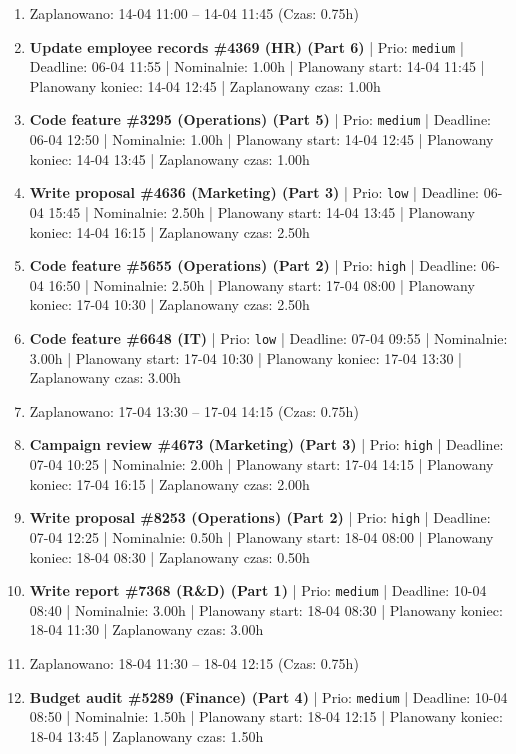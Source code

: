 {\begin{enumerate}
  \item [\textbf{PRZERWA}] Zaplanowano: 14-04 11:00 -- 14-04 11:45 (Czas: 0.75h)
  \item [\textbf{14658}] \textbf{Update employee records \#4369 (HR) (Part 6)} | Prio: \texttt{medium} | Deadline: 06-04 11:55 | Nominalnie: 1.00h | Planowany start: 14-04 11:45 | Planowany koniec: 14-04 12:45 | Zaplanowany czas: 1.00h
  \item [\textbf{14645}] \textbf{Code feature \#3295 (Operations) (Part 5)} | Prio: \texttt{medium} | Deadline: 06-04 12:50 | Nominalnie: 1.00h | Planowany start: 14-04 12:45 | Planowany koniec: 14-04 13:45 | Zaplanowany czas: 1.00h
  \item [\textbf{14684}] \textbf{Write proposal \#4636 (Marketing) (Part 3)} | Prio: \texttt{low} | Deadline: 06-04 15:45 | Nominalnie: 2.50h | Planowany start: 14-04 13:45 | Planowany koniec: 14-04 16:15 | Zaplanowany czas: 2.50h
  \item [\textbf{14626}] \textbf{Code feature \#5655 (Operations) (Part 2)} | Prio: \texttt{high} | Deadline: 06-04 16:50 | Nominalnie: 2.50h | Planowany start: 17-04 08:00 | Planowany koniec: 17-04 10:30 | Zaplanowany czas: 2.50h
  \item [\textbf{14683}] \textbf{Code feature \#6648 (IT)} | Prio: \texttt{low} | Deadline: 07-04 09:55 | Nominalnie: 3.00h | Planowany start: 17-04 10:30 | Planowany koniec: 17-04 13:30 | Zaplanowany czas: 3.00h
  \item [\textbf{PRZERWA}] Zaplanowano: 17-04 13:30 -- 17-04 14:15 (Czas: 0.75h)
  \item [\textbf{14625}] \textbf{Campaign review \#4673 (Marketing) (Part 3)} | Prio: \texttt{high} | Deadline: 07-04 10:25 | Nominalnie: 2.00h | Planowany start: 17-04 14:15 | Planowany koniec: 17-04 16:15 | Zaplanowany czas: 2.00h
  \item [\textbf{14614}] \textbf{Write proposal \#8253 (Operations) (Part 2)} | Prio: \texttt{high} | Deadline: 07-04 12:25 | Nominalnie: 0.50h | Planowany start: 18-04 08:00 | Planowany koniec: 18-04 08:30 | Zaplanowany czas: 0.50h
  \item [\textbf{14633}] \textbf{Write report \#7368 (R\&D) (Part 1)} | Prio: \texttt{medium} | Deadline: 10-04 08:40 | Nominalnie: 3.00h | Planowany start: 18-04 08:30 | Planowany koniec: 18-04 11:30 | Zaplanowany czas: 3.00h
  \item [\textbf{PRZERWA}] Zaplanowano: 18-04 11:30 -- 18-04 12:15 (Czas: 0.75h)
  \item [\textbf{14630}] \textbf{Budget audit \#5289 (Finance) (Part 4)} | Prio: \texttt{medium} | Deadline: 10-04 08:50 | Nominalnie: 1.50h | Planowany start: 18-04 12:15 | Planowany koniec: 18-04 13:45 | Zaplanowany czas: 1.50h

\end{enumerate}}

